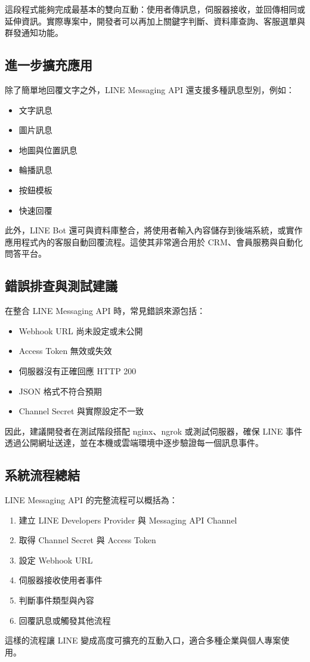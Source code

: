 這段程式能夠完成最基本的雙向互動：使用者傳訊息，伺服器接收，並回傳相同或延伸資訊。實際專案中，開發者可以再加上關鍵字判斷、資料庫查詢、客服選單與群發通知功能。

\subsection{進一步擴充應用}

除了簡單地回覆文字之外，LINE Messaging API 還支援多種訊息型別，例如：
\begin{itemize}[leftmargin=2em]
    \item 文字訊息
    \item 圖片訊息
    \item 地圖與位置訊息
    \item 輪播訊息
    \item 按鈕模板
    \item 快速回覆
\end{itemize}

此外，LINE Bot 還可與資料庫整合，將使用者輸入內容儲存到後端系統，或實作應用程式內的客服自動回覆流程。這使其非常適合用於 CRM、會員服務與自動化問答平台。

\subsection{錯誤排查與測試建議}

在整合 LINE Messaging API 時，常見錯誤來源包括：
\begin{itemize}[leftmargin=2em]
    \item Webhook URL 尚未設定或未公開
    \item Access Token 無效或失效
    \item 伺服器沒有正確回應 HTTP 200
    \item JSON 格式不符合預期
    \item Channel Secret 與實際設定不一致
\end{itemize}

因此，建議開發者在測試階段搭配 nginx、ngrok 或測試伺服器，確保 LINE 事件透過公開網址送達，並在本機或雲端環境中逐步驗證每一個訊息事件。

\subsection{系統流程總結}

LINE Messaging API 的完整流程可以概括為：
\begin{enumerate}[leftmargin=2em]
    \item 建立 LINE Developers Provider 與 Messaging API Channel
    \item 取得 Channel Secret 與 Access Token
    \item 設定 Webhook URL
    \item 伺服器接收使用者事件
    \item 判斷事件類型與內容
    \item 回覆訊息或觸發其他流程
\end{enumerate}

這樣的流程讓 LINE 變成高度可擴充的互動入口，適合多種企業與個人專案使用。
